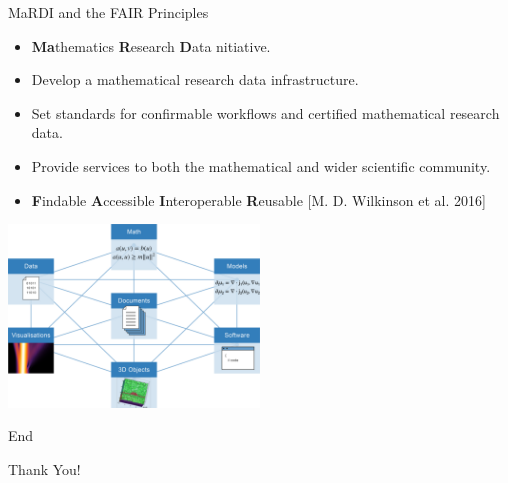 \documentclass[9pt]{beamer}
\theoremstyle{definition}
\begin{document}
\begin{frame}[fragile]{MaRDI and the FAIR Principles}
  \begin{itemize}
  \item \textbf{Ma}thematics \textbf{R}esearch \textbf{D}ata nitiative.
  \item Develop a mathematical research data infrastructure.
  \item Set standards for confirmable workflows and certified mathematical research data.
  \item Provide services to both the mathematical and wider scientific community.
  \item \textbf{F}indable \textbf{A}ccessible \textbf{I}nteroperable \textbf{R}eusable [M. D. Wilkinson et al. 2016]

  \end{itemize}
  \begin{center}
    \includegraphics[width=0.5\textwidth, height=0.5\textheight]{images/graph}
  \end{center}
\end{frame}


\begin{frame}[fragile]{End}
  \begin{center}
    Thank You!\\
  \end{center}
\end{frame}

\end{document}
